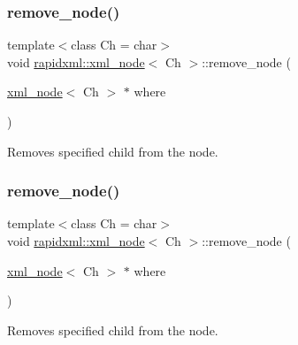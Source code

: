 \subsubsection{\texorpdfstring{remove\+\_\+node()}{remove\_node()}\hspace{0.1cm}{\footnotesize\ttfamily [1/2]}}
{\footnotesize\ttfamily template$<$class Ch = char$>$ \\
void \mbox{\hyperlink{classrapidxml_1_1xml__node}{rapidxml\+::xml\+\_\+node}}$<$ Ch $>$\+::remove\+\_\+node (\begin{DoxyParamCaption}\item[{\mbox{\hyperlink{classrapidxml_1_1xml__node}{xml\+\_\+node}}$<$ Ch $>$ $\ast$}]{where }\end{DoxyParamCaption})\hspace{0.3cm}{\ttfamily [inline]}}



Removes specified child from the node. 

\mbox{\label{classrapidxml_1_1xml__node_a98289923eb9e8889418a9eb0207ea35c}} 
\subsubsection{\texorpdfstring{remove\+\_\+node()}{remove\_node()}\hspace{0.1cm}{\footnotesize\ttfamily [2/2]}}
{\footnotesize\ttfamily template$<$class Ch = char$>$ \\
void \mbox{\hyperlink{classrapidxml_1_1xml__node}{rapidxml\+::xml\+\_\+node}}$<$ Ch $>$\+::remove\+\_\+node (\begin{DoxyParamCaption}\item[{\mbox{\hyperlink{classrapidxml_1_1xml__node}{xml\+\_\+node}}$<$ Ch $>$ $\ast$}]{where }\end{DoxyParamCaption})\hspace{0.3cm}{\ttfamily [inline]}}



Removes specified child from the node. 

\mbox{\label{classrapidxml_1_1xml__node_a5f91729128856b0aaab598d4364ace60}} 
